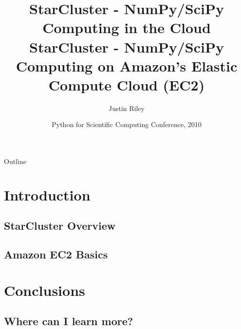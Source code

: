 \documentclass[english,compress]{beamer}
\title[StarCluster] 
{%
  StarCluster - NumPy/SciPy Computing in the Cloud%
}
\title{StarCluster - NumPy/SciPy Computing on Amazon's Elastic Compute Cloud (EC2)}
\author{Justin Riley}
\date[SciPy 2010]
{Python for Scientific Computing Conference, 2010}
\begin{document}

\frame{\titlepage}

\section[Outline]{}
\begin{frame}{Outline}
  \tableofcontents
\end{frame}

\section{Introduction}
\subsection{StarCluster Overview}


\subsection{Amazon EC2 Basics}

\section{Conclusions}
\subsection{Where can I learn more?}

\end{document}
